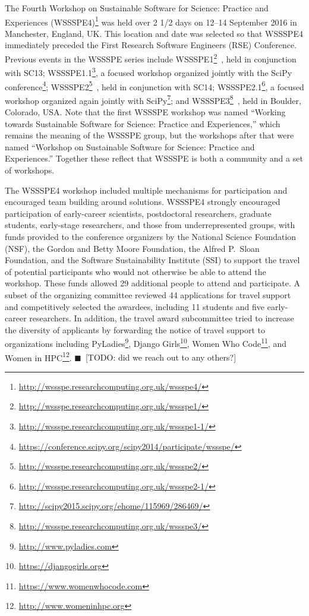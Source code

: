 \documentclass[11pt, oneside]{amsart}
\newcommand{\todo}[1]{{\color{blue}$\blacksquare$~\textsf{[TODO: #1]}}}
\begin{document}
The Fourth Workshop on Sustainable Software for Science: Practice and Experiences
(WSSSPE4)\footnote{\url{http://wssspe.researchcomputing.org.uk/wssspe4/}} was
held over 2 1/2 days on 12--14 September 2016 in Manchester, England, UK.
This location and date was selected so that WSSSPE4 immediately preceded the
First Research Software Engineers (RSE) Conference.
Previous events in the WSSSPE series include
WSSSPE1\footnote{\url{http://wssspe.researchcomputing.org.uk/wssspe1/}}~\cite{WSSSPE1-pre-report,WSSSPE1},
held in conjunction with SC13;
WSSSPE1.1\footnote{\url{http://wssspe.researchcomputing.org.uk/wssspe1-1/}}, a
focused workshop organized jointly with the SciPy
conference\footnote{\url{https://conference.scipy.org/scipy2014/participate/wssspe/}};
WSSSPE2\footnote{\url{http://wssspe.researchcomputing.org.uk/wssspe2/}}~\cite{WSSSPE2-pre-report,WSSSPE2},
held in conjunction with SC14;
WSSSPE2.1\footnote{\url{http://wssspe.researchcomputing.org.uk/wssspe2-1/}}, a
focused workshop organized again jointly with
SciPy\footnote{\url{http://scipy2015.scipy.org/ehome/115969/286469/}};
and WSSSPE3\footnote{\url{http://wssspe.researchcomputing.org.uk/wssspe3/}}~\cite{WSSSPE3},
held in Boulder, Colorado, USA.
Note that the first WSSSPE workshop was named
``Working towards
Sustainable Software for Science: Practice and Experiences,'' which remains the meaning
of the WSSSPE group, but the workshops after that were named
``Workshop on Sustainable
Software for Science: Practice and Experiences.'' Together these reflect
that WSSSPE is both a community and a set of workshops.


The WSSSPE4 workshop included multiple mechanisms for participation and
encouraged team building around solutions. WSSSPE4 strongly encouraged participation
of early-career scientists, postdoctoral researchers, graduate students,
early-stage researchers, and those from underrepresented groups,
with funds provided to the conference organizers by the National Science
Foundation (NSF), the Gordon and Betty Moore Foundation, the Alfred P.~Sloan Foundation, and the Software
Sustainability Institute (SSI) to support the travel of potential participants
who would not otherwise be able to attend the workshop. These
funds allowed 29 additional people to attend and participate. A subset of the
organizing committee reviewed 44 applications for travel support and
competitively selected the awardees, including 11 students and five early-career
researchers. In addition, the travel award subcommittee tried to increase the
diversity of applicants by forwarding the notice of travel support to
organizations including PyLadies\footnote{\url{http://www.pyladies.com}},
Django Girls\footnote{\url{https://djangogirls.org}},
Women Who Code\footnote{\url{https://www.womenwhocode.com}}, and
Women in HPC\footnote{\url{http://www.womeninhpc.org}}.
\todo{did we reach out to any others?}
\end{document}
